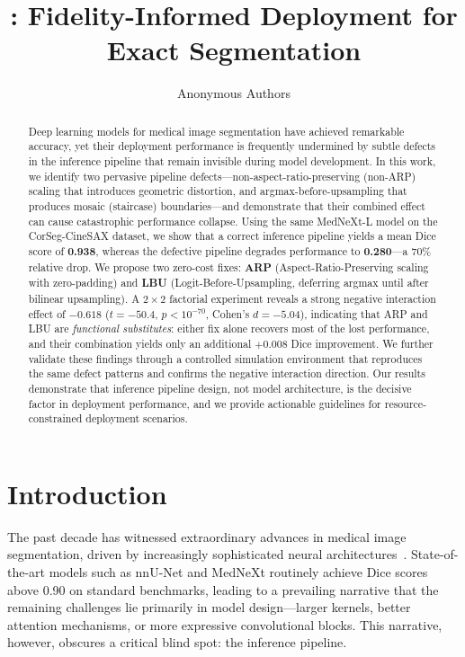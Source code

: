 \documentclass[10pt,twocolumn]{article}
\title{\fides: Fidelity-Informed Deployment for Exact Segmentation}
\author{
Anonymous Authors
}
\begin{document}
\maketitle

\begin{abstract}
Deep learning models for medical image segmentation have achieved remarkable accuracy, yet their deployment performance is frequently undermined by subtle defects in the inference pipeline that remain invisible during model development.
In this work, we identify two pervasive pipeline defects---non-aspect-ratio-preserving (non-ARP) scaling that introduces geometric distortion, and argmax-before-upsampling that produces mosaic (staircase) boundaries---and demonstrate that their combined effect can cause catastrophic performance collapse.
Using the same MedNeXt-L model on the CorSeg-CineSAX dataset, we show that a correct inference pipeline yields a mean Dice score of \textbf{0.938}, whereas the defective pipeline degrades performance to \textbf{0.280}---a 70\% relative drop.
We propose two zero-cost fixes: \textbf{ARP} (Aspect-Ratio-Preserving scaling with zero-padding) and \textbf{LBU} (Logit-Before-Upsampling, deferring argmax until after bilinear upsampling).
A $2\times2$ factorial experiment reveals a strong negative interaction effect of $-0.618$ ($t=-50.4$, $p<10^{-70}$, Cohen's $d=-5.04$), indicating that ARP and LBU are \emph{functional substitutes}: either fix alone recovers most of the lost performance, and their combination yields only an additional $+0.008$ Dice improvement.
We further validate these findings through a controlled simulation environment that reproduces the same defect patterns and confirms the negative interaction direction.
Our results demonstrate that inference pipeline design, not model architecture, is the decisive factor in deployment performance, and we provide actionable guidelines for resource-constrained deployment scenarios.
\end{abstract}

\section{Introduction}
\label{sec:intro}

The past decade has witnessed extraordinary advances in medical image segmentation, driven by increasingly sophisticated neural architectures~\cite{ronneberger2015u,cciccek2016nnunet,isensee2021nnunet,roy2023mednext}.
State-of-the-art models such as nnU-Net and MedNeXt routinely achieve Dice scores above 0.90 on standard benchmarks, leading to a prevailing narrative that the remaining challenges lie primarily in model design---larger kernels, better attention mechanisms, or more expressive convolutional blocks.
This narrative, however, obscures a critical blind spot: the inference pipeline.
\end{document}
